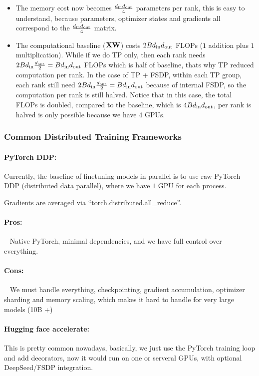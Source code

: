 \documentclass[11pt]{article}  %
\begin{document}
\begin{itemize}
  \item The memory cost now becomes $\frac{d_{\text{in}} d_{\text{out}}}{4}$ parameters per rank, this is easy to understand, because parameters, optimizer states and gradients all correspond to the $\frac{d_{\text{in}}d_{\text{out}}}{4}$ matrix.
  
  \item The computational baseline ($\mathbf{X}\mathbf{W}$) costs $2Bd_{\text{in}}d_{\text{out}}$ FLOPs ($1$ addition plus $1$ multiplication).
  While if we do TP only, then each rank needs $2Bd_{\text{in}} \frac{d_{\text{out}}}{2} = Bd_{\text{in}}d_{\text{out}}$ FLOPs which is half of baseline, thats why TP reduced computation per rank.
  In the case of TP + FSDP, within each TP group, each rank still need $2Bd_{\text{in}} \frac{d_{\text{out}}}{2} = Bd_{\text{in}}d_{\text{out}}$ because of internal FSDP, so the computation per rank is still halved.
  Notice that in this case, the total FLOPs is doubled, compared to the baseline, which is $4Bd_{\text{in}}d_{\text{out}}$, per rank is halved is only possible because we have $4$ GPUs.
\end{itemize}



\subsubsection{Common Distributed Training Frameworks}
\paragraph{PyTorch DDP:}
Currently, the baseline of finetuning models in parallel is to use raw PyTorch DDP (distributed data parallel), where we have $1$ GPU for each process.

Gradients are averaged via ``torch.distributed.all\_reduce''.

\paragraph{Pros:}

\textbullet~ Native PyTorch, minimal dependencies, and we have full control over everything.

\paragraph{Cons:}

\textbullet~ We must handle everything, checkpointing, gradient accumulation, optimizer sharding and memory scaling, which makes it hard to handle for very large models (10B +)

\paragraph{Hugging face accelerate:}
This is pretty common nowadays, basically, we just use the PyTorch training loop and add decorators, now it would run on one or serveral GPUs, with optional DeepSeed/FSDP integration.
\end{document}

